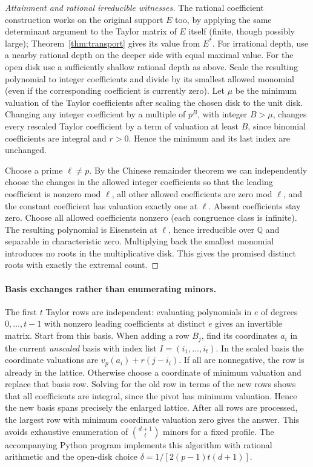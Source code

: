 \documentclass[11pt]{article}
\theoremstyle{remark}\newtheorem{remark}[theorem]{Remark}
\newcommand{\Q}{\mathbb Q}\newcommand{\Z}{\mathbb Z}\newcommand{\F}{\mathbb F}\newcommand{\C}{\mathbb C}
\newcommand{\vp}{v_p}\newcommand{\ord}{\operatorname{ord}}\newcommand{\spn}{\operatorname{span}}\newcommand{\res}{\operatorname{res}}
\begin{document}
\begin{proof}[Attainment and rational irreducible witnesses]
The rational coefficient construction works on the original support $E$ too, by
applying the same determinant argument to the Taylor matrix of $E$ itself (finite,
though possibly large); Theorem~\ref{thm:transport} gives its value from $E^*$.
For irrational depth, use a nearby rational depth on the deeper side with equal
maximal value. For the open disk use a sufficiently shallow rational depth as above.
Scale the resulting polynomial to integer coefficients and divide by its smallest
allowed monomial (even if the corresponding coefficient is currently zero).
Let $\mu$ be the minimum valuation of the Taylor coefficients after scaling the
chosen disk to the unit disk. Changing any integer coefficient by a multiple of
$p^B$, with integer $B>\mu$, changes every rescaled Taylor coefficient by a term of
valuation at least $B$, since binomial coefficients are integral and $r>0$.
Hence the minimum and its last index are unchanged.

Choose a prime $\ell\ne p$. By the Chinese remainder theorem we can independently
choose the changes in the allowed integer coefficients so that the leading coefficient
is nonzero mod $\ell$, all other allowed coefficients are zero mod $\ell$, and the
constant coefficient has valuation exactly one at $\ell$. Absent coefficients stay
zero. Choose all allowed coefficients nonzero (each congruence class is infinite).
The resulting polynomial is Eisenstein at $\ell$, hence irreducible over $\Q$ and
separable in characteristic zero. Multiplying back the smallest monomial introduces
no roots in the multiplicative disk. This gives the promised distinct roots with
exactly the extremal count.
\end{proof}

\paragraph{Basis exchanges rather than enumerating minors.}
The first $t$ Taylor rows are independent: evaluating polynomials in $e$ of degrees
$0,\ldots,t-1$ with nonzero leading coefficients at distinct $e$ gives an invertible
matrix. Start from this basis. When adding a row $B_j$, find its coordinates $a_i$ in
the current \emph{unscaled} basis with index list $I=(i_1,\ldots,i_t)$. In the scaled
basis the coordinate valuations are $\vp(a_i)+r(j-i_i)$. If all are nonnegative, the
row is already in the lattice. Otherwise choose a coordinate of minimum valuation
and replace that basis row. Solving for the old row in terms of the new rows shows that
all coefficients are integral, since the pivot has minimum valuation. Hence the new
basis spans precisely the enlarged lattice. After all rows are processed, the largest
row with minimum coordinate valuation zero gives the answer. This avoids exhaustive
enumeration of $\binom{d+1}{t}$ minors for a fixed profile. The accompanying Python
program implements this algorithm with rational arithmetic and the open-disk choice
$\delta=1/[2(p-1)t(d+1)]$.
\end{document}
